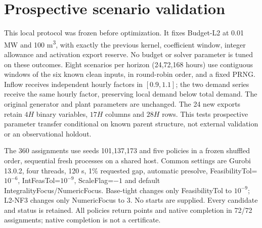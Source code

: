 \section{Prospective scenario validation}
\label{sec:orf-prospective-supplement}
This local protocol was frozen before optimization. It fixes Budget-L2 at
0.01 MW and 100 m\textsuperscript{3}, with exactly the previous kernel,
coefficient window, integer allowance and activation export reserve. No budget
or solver parameter is tuned on these outcomes. Eight scenarios per horizon
(24,72,168 hours) use contiguous windows of the six known clean inputs, in
round-robin order, and a fixed PRNG. Inflow receives independent hourly factors
in $[0.9,1.1]$; the two demand series receive the same hourly factor, preserving
local demand below total demand. The original generator and plant parameters
are unchanged. The 24 new exports retain $4H$ binary variables, $17H$ columns
and $28H$ rows. This tests prospective parameter transfer conditional on known
parent structure, not external validation or an observational holdout.

The 360 assignments use seeds 101,137,173 and five policies in a frozen shuffled
order, sequential fresh processes on a shared host. Common settings are Gurobi
13.0.2, four threads, 120 s, 1\% requested gap, automatic presolve,
FeasibilityTol=$10^{-6}$, IntFeasTol=$10^{-9}$, ScaleFlag=$-1$ and default
IntegralityFocus/NumericFocus. Base-tight changes only FeasibilityTol to
$10^{-9}$; L2-NF3 changes only NumericFocus to 3. No starts are supplied.
Every candidate and status is retained. All policies return points and native
completion in 72/72 assignments; native completion is not a certificate.

